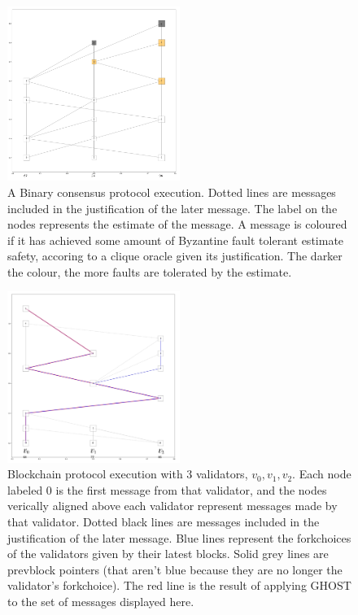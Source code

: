 \documentclass{article}
\theoremstyle{definition}
\begin{document}
\begin{figure}[h!]
\centering
\includegraphics[width=0.5\textwidth]{3binary}
\caption{A Binary consensus protocol execution. Dotted lines are messages included in the justification of the later message. The label on the nodes represents the estimate of the message. A message is coloured if it has achieved some amount of Byzantine fault tolerant estimate safety, accoring to a clique oracle given its justification. The darker the colour, the more faults are tolerated by the estimate.}
\end{figure}


\begin{figure}[h!]
\centering
\includegraphics[width=0.5\textwidth]{3nodeblockchain-fix}
\caption{Blockchain protocol execution with 3 validators, $v_0, v_1, v_2$. Each node labeled $0$ is the first message from that validator, and the nodes verically aligned above each validator represent messages made by that validator. Dotted black lines are messages included in the justification of the later message. Blue lines represent the forkchoices of the validators given by their latest blocks. Solid grey lines are prevblock pointers (that aren't blue because they are no longer the validator's forkchoice). The red line is the result of applying GHOST to the set of messages displayed here.}
\end{figure}
\end{document}
